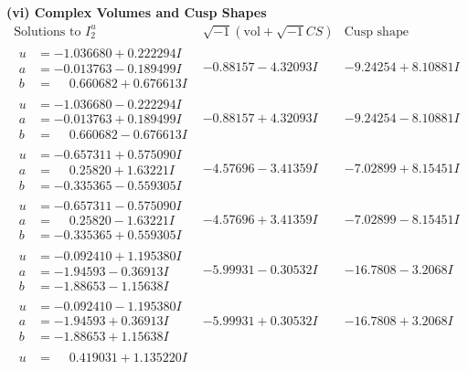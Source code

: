 \documentclass[1p]{elsarticle_modified}
\theoremstyle{definition}
\newcommand{\I}{\sqrt{-1}}
\begin{document}
\newpage\flushleft \textbf{(vi) Complex Volumes and Cusp Shapes}
$$\begin{array}{c|c|c}  
\text{Solutions to }I^u_{2}& \I (\text{vol} + \sqrt{-1}CS) & \text{Cusp shape}\\
 \hline 
\begin{aligned}
u &= -1.036680 + 0.222294 I \\
a &= -0.013763 - 0.189499 I \\
b &= \phantom{-}0.660682 + 0.676613 I\end{aligned}
 & -0.88157 - 4.32093 I & -9.24254 + 8.10881 I \\ \hline\begin{aligned}
u &= -1.036680 - 0.222294 I \\
a &= -0.013763 + 0.189499 I \\
b &= \phantom{-}0.660682 - 0.676613 I\end{aligned}
 & -0.88157 + 4.32093 I & -9.24254 - 8.10881 I \\ \hline\begin{aligned}
u &= -0.657311 + 0.575090 I \\
a &= \phantom{-}0.25820 + 1.63221 I \\
b &= -0.335365 - 0.559305 I\end{aligned}
 & -4.57696 - 3.41359 I & -7.02899 + 8.15451 I \\ \hline\begin{aligned}
u &= -0.657311 - 0.575090 I \\
a &= \phantom{-}0.25820 - 1.63221 I \\
b &= -0.335365 + 0.559305 I\end{aligned}
 & -4.57696 + 3.41359 I & -7.02899 - 8.15451 I \\ \hline\begin{aligned}
u &= -0.092410 + 1.195380 I \\
a &= -1.94593 - 0.36913 I \\
b &= -1.88653 - 1.15638 I\end{aligned}
 & -5.99931 - 0.30532 I & -16.7808 - 3.2068 I \\ \hline\begin{aligned}
u &= -0.092410 - 1.195380 I \\
a &= -1.94593 + 0.36913 I \\
b &= -1.88653 + 1.15638 I\end{aligned}
 & -5.99931 + 0.30532 I & -16.7808 + 3.2068 I \\ \hline\begin{aligned}
u &= \phantom{-}0.419031 + 1.135220 I \\

\end{aligned}
\end{array}$$
\end{document}
